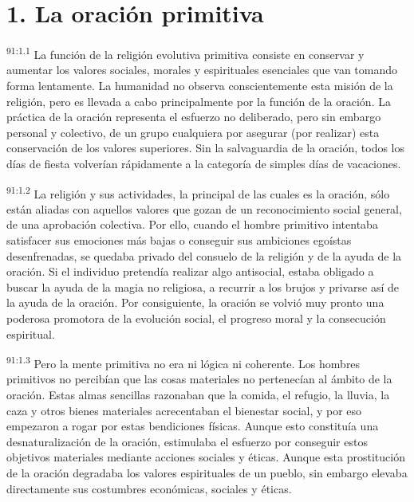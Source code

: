 \documentclass[twoside, 11pt]{book}
\begin{document}
\section*{1. La oración primitiva}
\par
\textsuperscript{91:1.1} La función de la religión evolutiva primitiva consiste en conservar y aumentar los valores sociales, morales y espirituales esenciales que van tomando forma lentamente. La humanidad no observa conscientemente esta misión de la religión, pero es llevada a cabo principalmente por la función de la oración. La práctica de la oración representa el esfuerzo no deliberado, pero sin embargo personal y colectivo, de un grupo cualquiera por asegurar (por realizar) esta conservación de los valores superiores. Sin la salvaguardia de la oración, todos los días de fiesta volverían rápidamente a la categoría de simples días de vacaciones.

\par
\textsuperscript{91:1.2} La religión y sus actividades, la principal de las cuales es la oración, sólo están aliadas con aquellos valores que gozan de un reconocimiento social general, de una aprobación colectiva. Por ello, cuando el hombre primitivo intentaba satisfacer sus emociones más bajas o conseguir sus ambiciones egoístas desenfrenadas, se quedaba privado del consuelo de la religión y de la ayuda de la oración. Si el individuo pretendía realizar algo antisocial, estaba obligado a buscar la ayuda de la magia no religiosa, a recurrir a los brujos y privarse así de la ayuda de la oración. Por consiguiente, la oración se volvió muy pronto una poderosa promotora de la evolución social, el progreso moral y la consecución espiritual.

\par
\textsuperscript{91:1.3} Pero la mente primitiva no era ni lógica ni coherente. Los hombres primitivos no percibían que las cosas materiales no pertenecían al ámbito de la oración. Estas almas sencillas razonaban que la comida, el refugio, la lluvia, la caza y otros bienes materiales acrecentaban el bienestar social, y por eso empezaron a rogar por estas bendiciones físicas. Aunque esto constituía una desnaturalización de la oración, estimulaba el esfuerzo por conseguir estos objetivos materiales mediante acciones sociales y éticas. Aunque esta prostitución de la oración degradaba los valores espirituales de un pueblo, sin embargo elevaba directamente sus costumbres económicas, sociales y éticas.
\end{document}
